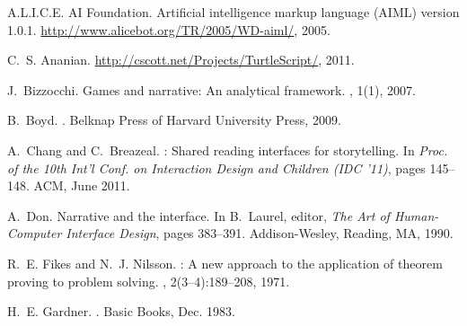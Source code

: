 \documentclass{sig-alternate}
\begin{document}

%


\begin{thebibliography}{10}

{A.L.I.C.E. AI Foundation}.
\newblock Artificial intelligence markup language ({AIML}) version 1.0.1.
\newblock \url{http://www.alicebot.org/TR/2005/WD-aiml/}, 2005.

C.~S. Ananian.
\newblock \url{http://cscott.net/Projects/TurtleScript/}, 2011.

J.~Bizzocchi.
\newblock Games and narrative: An analytical framework.
, 1(1), 2007.

B.~Boyd.
.
\newblock Belknap Press of Harvard University Press, 2009.

A.~Chang and C.~Breazeal.
: Shared reading interfaces for storytelling.
\newblock In {\em Proc. of the 10th Int'l Conf. on Interaction Design and
  Children (IDC '11)}, pages 145--148. ACM, June 2011.

A.~Don.
\newblock Narrative and the interface.
\newblock In B.~Laurel, editor, {\em The Art of Human-Computer Interface
  Design}, pages 383--391. Addison-Wesley, Reading, MA, 1990.

R.~E. Fikes and N.~J. Nilsson.
: A new approach to the application of theorem proving to
  problem solving.
, 2(3--4):189--208, 1971.

H.~E. Gardner.
.
\newblock Basic Books, Dec. 1983.


\end{thebibliography}
\end{document}

